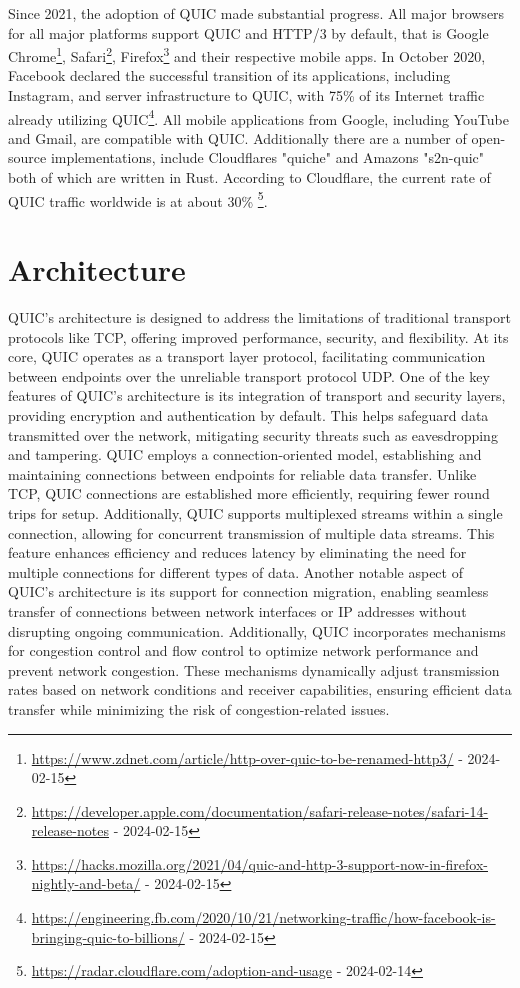 Since 2021, the adoption of QUIC made substantial progress. All major browsers for all major platforms support QUIC and HTTP/3 by
default, that is Google Chrome\footnote{\url{https://www.zdnet.com/article/http-over-quic-to-be-renamed-http3/} - 2024-02-15},
Safari\footnote{\url{https://developer.apple.com/documentation/safari-release-notes/safari-14-release-notes} - 2024-02-15},
Firefox\footnote{\url{https://hacks.mozilla.org/2021/04/quic-and-http-3-support-now-in-firefox-nightly-and-beta/} - 2024-02-15}
and their respective mobile apps. In October 2020, Facebook declared the successful transition of its applications, including
Instagram, and server infrastructure to QUIC, with 75\% of its Internet traffic already utilizing
QUIC\footnote{\url{https://engineering.fb.com/2020/10/21/networking-traffic/how-facebook-is-bringing-quic-to-billions/} - 2024-02-15}.
All mobile applications from Google, including YouTube and Gmail, are compatible with QUIC. Additionally there are a number of
open-source implementations, include Cloudflares "quiche" and Amazons "s2n-quic" both of which are written in Rust. According to
Cloudflare, the current rate of QUIC traffic worldwide is at about
30\% \footnote{\url{https://radar.cloudflare.com/adoption-and-usage} - 2024-02-14}.

\section{Architecture}

QUIC's architecture is designed to address the limitations of traditional transport protocols like TCP, offering improved
performance, security, and flexibility. At its core, QUIC operates as a transport layer protocol, facilitating communication
between endpoints over the unreliable transport protocol UDP. One of the key features of QUIC's architecture is its integration
of transport and security layers, providing encryption and authentication by default. This helps safeguard data transmitted over
the network, mitigating security threats such as eavesdropping and tampering. QUIC employs a connection-oriented model, establishing
and maintaining connections between endpoints for reliable data transfer. Unlike TCP, QUIC connections are established more
efficiently, requiring fewer round trips for setup. Additionally, QUIC supports multiplexed streams within a single connection,
allowing for concurrent transmission of multiple data streams. This feature enhances efficiency and reduces latency by eliminating
the need for multiple connections for different types of data. Another notable aspect of QUIC's architecture is its support for
connection migration, enabling seamless transfer of connections between network interfaces or IP addresses without disrupting
ongoing communication. Additionally, QUIC incorporates mechanisms for congestion control and flow control to optimize network
performance and prevent network congestion. These mechanisms dynamically adjust transmission rates based on network conditions
and receiver capabilities, ensuring efficient data transfer while minimizing the risk of congestion-related issues.

